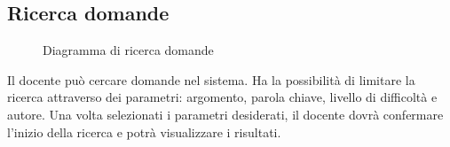 \documentclass[a4paper, titlepage]{article}
\begin{document}
\newpage
\subsection{Ricerca domande}
\begin{figure}[H]
	\centering
	\noindent{}
	\caption{Diagramma di ricerca domande}
\end{figure}
Il docente può cercare domande nel sistema. Ha la possibilità di limitare la ricerca attraverso dei parametri: argomento, parola chiave, livello di difficoltà e autore. Una volta selezionati i parametri desiderati, il docente dovrà confermare l’inizio della ricerca e potrà visualizzare i risultati. 
\newpage
\end{document}

